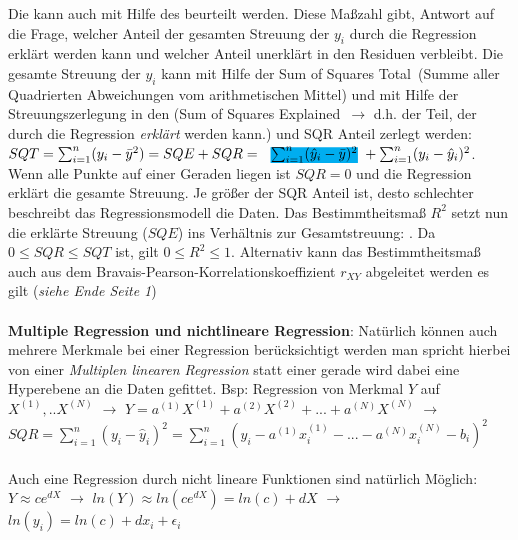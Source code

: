 Die  kann auch mit Hilfe des  beurteilt werden. Diese Maßzahl gibt, Antwort auf die Frage, welcher Anteil der gesamten Streuung der $y_i$ durch die Regression erklärt werden kann und welcher Anteil unerklärt in den Residuen verbleibt. Die gesamte Streuung der $y_i$ kann mit Hilfe der \glqq Sum of Squares Total\grqq\,  (Summe aller Quadrierten Abweichungen vom arithmetischen Mittel) und mit Hilfe der Streuungszerlegung in den  (\glqq Sum of Squares Explained\grqq\, $\rightarrow$ d.h. der Teil, der durch die Regression \emph{erklärt} werden kann.) und SQR Anteil zerlegt werden: $SQT = \sum_{i=1}^n(y_i - \bar{y}^2) = SQE + SQR = \text{\hlcm{$\sum_{i=1}^n(\hat{y}_i - \bar{y})^2$}} + \sum_{i=1}^n(y_i - \hat{y}_i)^2$. Wenn alle Punkte auf einer Geraden liegen ist $SQR = 0$ und die Regression erklärt die gesamte Streuung. Je größer der SQR Anteil ist, desto schlechter beschreibt das Regressionsmodell die Daten. Das Bestimmtheitsmaß $R^2$ setzt nun die erklärte Streuung ($SQE$) ins Verhältnis zur Gesamtstreuung: . Da $0 \le SQR \le SQT$ ist, gilt $0 \le R^2 \le 1$. Alternativ kann das Bestimmtheitsmaß auch aus dem Bravais-Pearson-Korrelationskoeffizient $r_{XY}$ abgeleitet werden es gilt  (\emph{siehe Ende Seite 1})\\\\
\textbf{Multiple Regression und nichtlineare Regression}: Natürlich können auch mehrere Merkmale bei einer Regression berücksichtigt werden man spricht hierbei von einer \emph{Multiplen linearen Regression} statt einer gerade wird dabei eine Hyperebene an die Daten gefittet. Bsp: Regression von Merkmal $Y$ auf $X^{(1)}, .. X^{(N)}$ $\rightarrow$ $Y = a^{(1)}X^{(1)} + a^{(2)}X^{(2)} + ... + a^{(N)}X^{(N)}$ $\rightarrow$ $SQR = \sum_{i=1}^n (y_i - \hat{y}_i)^2 = \sum_{i=1}^n(y_i - a^{(1)}x_i^{(1)} - ... - a^{(N)}x_i^{(N)} - b_i)^2$\\\\
Auch eine Regression durch nicht lineare Funktionen sind natürlich Möglich: $Y \approx ce^{dX}$ $\rightarrow$ $ln(Y) \approx ln(ce^{dX}) = ln(c) + dX$ $\rightarrow$ $ln(y_i) = ln(c) + dx_i + \epsilon_i$